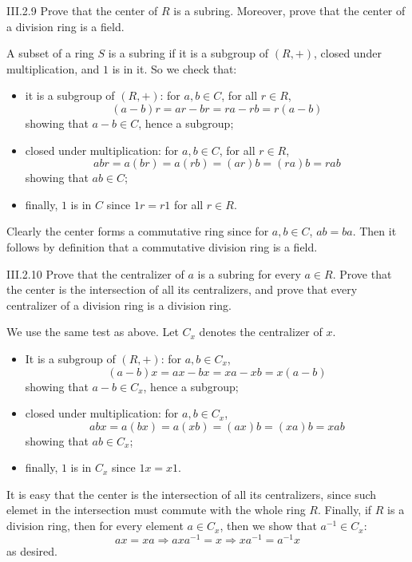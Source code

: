 \begin{problem}{III.2.9}
Prove that the center of $R$ is a subring. Moreover, prove that the center of a division ring is a field.
\end{problem}
\begin{pf}
A subset of a ring $S$ is a subring if it is a subgroup of $(R,+)$, closed under multiplication, and $1$ is in it. So we check that:
\begin{itemize}
    \setlength\itemsep{0pt}
    \item it is a subgroup of $(R,+)$: for $a,b \in C$, for all $r \in R$,
    \[
    (a-b)r = ar - br = ra - rb = r(a-b)    
    \]
    showing that $a-b \in C$, hence a subgroup;
    \item closed under multiplication: for $a,b \in C$, for all $r \in R$,
    \[
    abr = a(br) = a(rb) = (ar)b = (ra)b = rab     
    \]
    showing that $ab \in C$;
    \item finally, $1$ is in $C$ since $1r = r1$ for all $r \in R$.
\end{itemize}


Clearly the center forms a commutative ring since for $a,b \in C$, $ab = ba$. Then it follows by definition that a commutative division ring is a field. 
\end{pf}

\begin{problem}{III.2.10}
Prove that the centralizer of $a$ is a subring for every $a \in R$. Prove that the center is the intersection of all its centralizers, and prove that every centralizer of a division ring is a division ring.
\end{problem}
\begin{pf}
We use the same test as above. Let $C_x$ denotes the centralizer of $x$.
\begin{itemize}
    \setlength\itemsep{0pt}
    \item It is a subgroup of $(R,+)$: for $a,b \in C_x$,
    \[
    (a-b)x = ax - bx = xa - xb = x(a-b)    
    \]
    showing that $a-b \in C_x$, hence a subgroup;
    \item closed under multiplication: for $a,b \in C_x$,
    \[
    abx = a(bx) = a(xb) = (ax)b = (xa)b = xab     
    \]
    showing that $ab \in C_x$;
    \item finally, $1$ is in $C_x$ since $1x = x1$.
\end{itemize}
It is easy that the center is the intersection of all its centralizers, since such elemet in the intersection must commute with the whole ring $R$. Finally, if $R$ is a division ring, then for every element $a \in C_x$, then we show that $a^{-1} \in C_x$:
\[
ax = xa \Rightarrow axa^{-1} = x \Rightarrow xa^{-1} = a^{-1}x
\]
as desired.
\end{pf}

